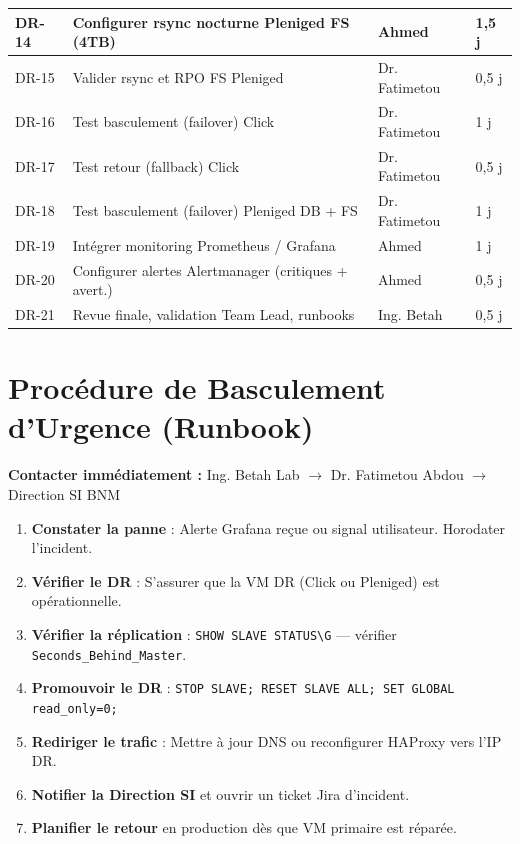 \documentclass[a4paper,11pt]{article}
\newenvironment{alertbox}[1][Attention]{%
  \begin{tcolorbox}[colback=bnmorange, colframe=bnmred, fonttitle=\bfseries, title=#1]
}{%
  \end{tcolorbox}
}
\begin{document}
\begin{longtable}{|l|p{7cm}|l|l|}
\hline
\rowcolor{bnmlightgray}
DR-14 & Configurer rsync nocturne Pleniged FS (4TB) & Ahmed & 1,5 j \\
\hline
DR-15 & Valider rsync et RPO FS Pleniged & Dr. Fatimetou & 0,5 j \\
\hline
\rowcolor{bnmlightgray}
DR-16 & Test basculement (failover) Click & Dr. Fatimetou & 1 j \\
\hline
DR-17 & Test retour (fallback) Click & Dr. Fatimetou & 0,5 j \\
\hline
\rowcolor{bnmlightgray}
DR-18 & Test basculement (failover) Pleniged DB + FS & Dr. Fatimetou & 1 j \\
\hline
DR-19 & Intégrer monitoring Prometheus / Grafana & Ahmed & 1 j \\
\hline
\rowcolor{bnmlightgray}
DR-20 & Configurer alertes Alertmanager (critiques + avert.) & Ahmed & 0,5 j \\
\hline
DR-21 & Revue finale, validation Team Lead, runbooks & Ing. Betah & 0,5 j \\
\hline
\end{longtable}

\section{Procédure de Basculement d'Urgence (Runbook)}

\begin{alertbox}[En Cas de Panne — Procédure d'Urgence]
\textbf{Contacter immédiatement :} Ing. Betah Lab $\rightarrow$ Dr. Fatimetou Abdou $\rightarrow$ Direction SI BNM
\end{alertbox}

\begin{enumerate}
  \item \textbf{Constater la panne} : Alerte Grafana reçue ou signal utilisateur. Horodater l'incident.
  \item \textbf{Vérifier le DR} : S'assurer que la VM DR (Click ou Pleniged) est opérationnelle.
  \item \textbf{Vérifier la réplication} : \texttt{SHOW SLAVE STATUS\textbackslash G} — vérifier \texttt{Seconds\_Behind\_Master}.
  \item \textbf{Promouvoir le DR} : \texttt{STOP SLAVE; RESET SLAVE ALL; SET GLOBAL read\_only=0;}
  \item \textbf{Rediriger le trafic} : Mettre à jour DNS ou reconfigurer HAProxy vers l'IP DR.
  \item \textbf{Notifier la Direction SI} et ouvrir un ticket Jira d'incident.
  \item \textbf{Planifier le retour} en production dès que VM primaire est réparée.
\end{enumerate}
\end{document}
